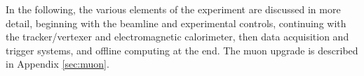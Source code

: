 
In the following, the various elements of the experiment are discussed in more detail, beginning with the beamline and experimental controls, continuing with the tracker/vertexer and electromagnetic calorimeter, then data acquisition and trigger systems, and offline computing at the end. The muon upgrade is described in Appendix \ref{sec:muon}.
